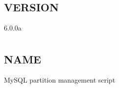 \documentclass[letterpaper,10pt,english]{sphinxmanual}
\begin{document}
\section{VERSION}
\label{\detokenize{mariadb-kill:version}}
 6.0.0a


\chapter{}
\label{\detokenize{mariadb-parted:mariadb-parted}}\label{\detokenize{mariadb-parted::doc}}

\section{NAME}
\label{\detokenize{mariadb-parted:name}}
 \sphinxhyphen{} MySQL partition management script
\end{document}
